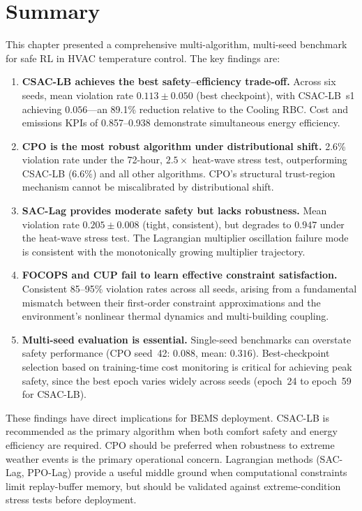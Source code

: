 \section{Summary}
\label{sec:temp-summary}

This chapter presented a comprehensive multi-algorithm, multi-seed benchmark
for safe RL in HVAC temperature control.  The key findings are:

\begin{enumerate}
  \item \textbf{CSAC-LB achieves the best safety--efficiency trade-off.}
    Across six seeds, mean violation rate $0.113 \pm 0.050$ (best checkpoint),
    with CSAC-LB~s1 achieving $0.056$---an 89.1\% reduction relative to the
    Cooling RBC.  Cost and emissions KPIs of 0.857--0.938 demonstrate
    simultaneous energy efficiency.

  \item \textbf{CPO is the most robust algorithm under distributional shift.}
    2.6\% violation rate under the 72-hour, $2.5\times$ heat-wave stress test,
    outperforming CSAC-LB ($6.6\%$) and all other algorithms.  CPO's structural
    trust-region mechanism cannot be miscalibrated by distributional shift.

  \item \textbf{SAC-Lag provides moderate safety but lacks robustness.}
    Mean violation rate $0.205 \pm 0.008$ (tight, consistent), but degrades
    to $0.947$ under the heat-wave stress test.  The Lagrangian multiplier
    oscillation failure mode is consistent with the monotonically growing
    multiplier trajectory.

  \item \textbf{FOCOPS and CUP fail to learn effective constraint
    satisfaction.}  Consistent 85--95\% violation rates across all seeds,
    arising from a fundamental mismatch between their first-order constraint
    approximations and the environment's nonlinear thermal dynamics and
    multi-building coupling.

  \item \textbf{Multi-seed evaluation is essential.}  Single-seed benchmarks
    can overstate safety performance (CPO seed~42: $0.088$, mean: $0.316$).
    Best-checkpoint selection based on training-time cost monitoring is
    critical for achieving peak safety, since the best epoch varies widely
    across seeds (epoch~24 to epoch~59 for CSAC-LB).
\end{enumerate}

These findings have direct implications for BEMS deployment.  CSAC-LB is
recommended as the primary algorithm when both comfort safety and energy
efficiency are required.  CPO should be preferred when robustness to extreme
weather events is the primary operational concern.  Lagrangian methods (SAC-Lag,
PPO-Lag) provide a useful middle ground when computational constraints limit
replay-buffer memory, but should be validated against extreme-condition stress
tests before deployment.
